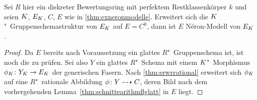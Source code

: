 \begin{Satz}\label{thm:fallstriktehenselisierung}
  Sei $R$ hier ein %
  diskreter Bewertungsring mit
  perfektem Restklassenkörper $k$
  und seien $K$, $E_{K}$, $C$, $E$ wie in \ref{thm:exneronmodelle}.
  Erweitert sich die $K$"~Gruppenschemastruktur von $E_{K}$ auf
  $E=C^0$, dann ist $E$ Néron-Modell von $E_{K}$.
  \begin{proof}
    Da $E$ bereits nach Voraussetzung ein glattes $R$"~Gruppenschema ist,
    ist noch die \NAbbEig zu prüfen.
    Sei also $Y$ ein glattes $R$"~Schema mit einem $K$"~Morphismus
    $\phi_{K}\colon Y_{K}\to E_{K}$ der generischen Fasern.
    Nach \ref{thm:erwrrational} erweitert sich $\phi_{K}$ auf eine
    $R$"~rationale Abbildung ${\phi\colon Y\dashrightarrow C}$, deren Bild nach dem
    vorhergehenden Lemma~\ref{thm:schnittearithmflglatt} in $E$
    liegt.
    

\end{proof}
\end{Satz}
